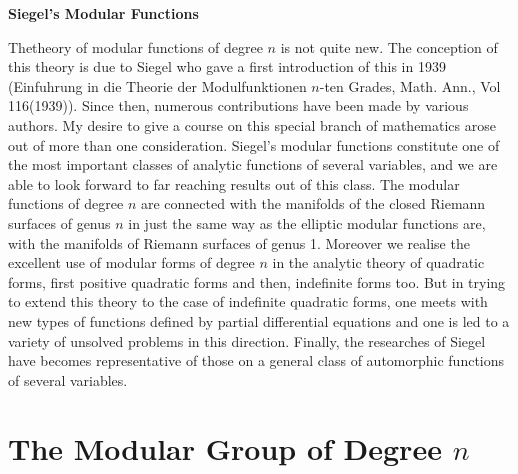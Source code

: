 \thispagestyle{empty}
\begin{center} 
{\huge\textbf{Siegel's Modular Functions}}
\end{center}

The\pageoriginale theory of modular functions of degree $n$ is not
quite new. The 
conception of this theory is due to Siegel who gave a first
introduction of this in 1939 (Einfuhrung in die Theorie der
Modulfunktionen $n$-ten Grades, Math. Ann., Vol 116(1939)). Since
then, numerous contributions have been made by various authors. My
desire to give a course on this special branch of mathematics arose
out of more than one consideration. Siegel's modular functions
constitute one of the most important classes of analytic functions of
several variables, and we are able to look forward to far reaching
results out of this class. The modular functions of degree $n$ are
connected with the manifolds of the closed Riemann surfaces of genus
$n$ in just the same way as the elliptic modular functions are, with
the manifolds of Riemann surfaces of genus 1. Moreover we realise
the excellent use of modular forms of degree $n$ in the analytic
theory of quadratic forms, first positive quadratic forms and then,
indefinite forms too. But in trying to extend this theory to the case
of indefinite quadratic forms, one meets with new types of functions
defined by partial differential equations and one is led to a variety
of unsolved problems in this direction. Finally, the researches of
Siegel have becomes representative of those on a general class of
automorphic functions of several variables. 


\chapter{The Modular Group of Degree \texorpdfstring{$n$}{n}}

